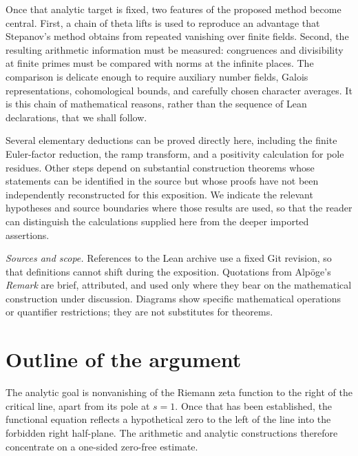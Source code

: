 \documentclass[11pt,openany,oneside]{scrbook}
\theoremstyle{definition}
\theoremstyle{remark}
\begin{document}
Once that analytic target is fixed, two features of the proposed method become central. First, a chain of theta lifts is used to reproduce an advantage that Stepanov's method obtains from repeated vanishing over finite fields. Second, the resulting arithmetic information must be measured: congruences and divisibility at finite primes must be compared with norms at the infinite places. The comparison is delicate enough to require auxiliary number fields, Galois representations, cohomological bounds, and carefully chosen character averages. It is this chain of mathematical reasons, rather than the sequence of Lean declarations, that we shall follow.

Several elementary deductions can be proved directly here, including the finite Euler-factor reduction, the ramp transform, and a positivity calculation for pole residues. Other steps depend on substantial construction theorems whose statements can be identified in the source but whose proofs have not been independently reconstructed for this exposition. We indicate the relevant hypotheses and source boundaries where those results are used, so that the reader can distinguish the calculations supplied here from the deeper imported assertions.

\bigskip
\noindent\textit{Sources and scope.} References to the Lean archive use a fixed Git revision, so that definitions cannot shift during the exposition. Quotations from Alp\"oge's \emph{Remark} are brief, attributed, and used only where they bear on the mathematical construction under discussion. Diagrams show specific mathematical operations or quantifier restrictions; they are not substitutes for theorems.

\chapter*{Outline of the argument}

The analytic goal is nonvanishing of the Riemann zeta function to the right of the critical line, apart from its pole at $s=1$. Once that has been established, the functional equation reflects a hypothetical zero to the left of the line into the forbidden right half-plane. The arithmetic and analytic constructions therefore concentrate on a one-sided zero-free estimate.
\end{document}
